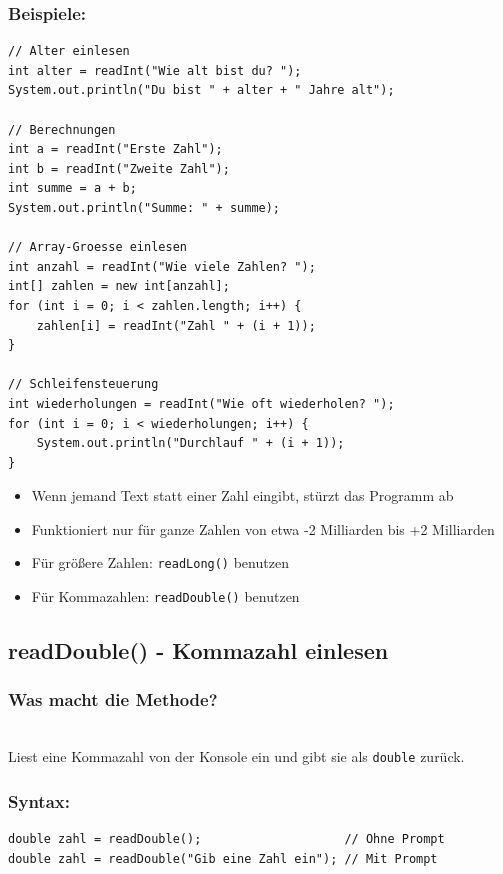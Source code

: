 \subsubsection*{Beispiele:}
\begin{lstlisting}
// Alter einlesen
int alter = readInt("Wie alt bist du? ");
System.out.println("Du bist " + alter + " Jahre alt");

// Berechnungen
int a = readInt("Erste Zahl");
int b = readInt("Zweite Zahl");
int summe = a + b;
System.out.println("Summe: " + summe);

// Array-Groesse einlesen
int anzahl = readInt("Wie viele Zahlen? ");
int[] zahlen = new int[anzahl];
for (int i = 0; i < zahlen.length; i++) {
    zahlen[i] = readInt("Zahl " + (i + 1));
}

// Schleifensteuerung
int wiederholungen = readInt("Wie oft wiederholen? ");
for (int i = 0; i < wiederholungen; i++) {
    System.out.println("Durchlauf " + (i + 1));
}
\end{lstlisting}

\begin{achtung}
	\begin{itemize}
		\item Wenn jemand Text statt einer Zahl eingibt, stürzt das Programm ab
		\item Funktioniert nur für ganze Zahlen von etwa -2 Milliarden bis +2 Milliarden
		\item Für größere Zahlen: \texttt{readLong()} benutzen
		\item Für Kommazahlen: \texttt{readDouble()} benutzen
	\end{itemize}
\end{achtung}

\newpage


\subsection*{readDouble() - Kommazahl einlesen}

\subsubsection*{Was macht die Methode?}\\
Liest eine Kommazahl von der Konsole ein und gibt sie als \texttt{double} zurück.

\subsubsection*{Syntax:}
\begin{lstlisting}
double zahl = readDouble();                    // Ohne Prompt
double zahl = readDouble("Gib eine Zahl ein"); // Mit Prompt
\end{lstlisting}

